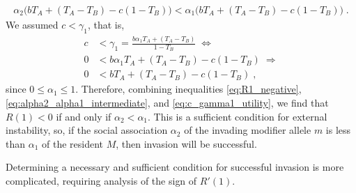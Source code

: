 \documentclass[12pt]{extarticle}
\begin{document}
\begin{appendices}
\begin{equation}
\begin{aligned}
\alpha_2 \big(b T_{A} + (T_A-T_B) - c(1-T_B)\big) <
\alpha_1 \big(b T_{A} + (T_A-T_B) - c(1-T_B)\big) \;.
\end{aligned}
\end{equation}
We assumed $c<\gamma_1$, that is,
\begin{equation} \label{eq:c_gamma1_utility}
\begin{aligned}
c &< \gamma_1 = \frac{b \alpha_1 T_A + (T_A-T_B)}{1-T_B} \; \Leftrightarrow \\
0 &< b \alpha_1 T_A + (T_A-T_B) - c(1-T_B) \; \Rightarrow \\
0 &< b T_A + (T_A-T_B) - c(1-T_B) \;,
\end{aligned}
\end{equation}
since $0 \le \alpha_1 \le 1$.
Therefore, combining inequalities \ref{eq:R1_negative}, \ref{eq:alpha2_alpha1_intermediate}, and \ref{eq:c_gamma1_utility}, we find that $R(1)<0$ if and only if $\alpha_2 < \alpha_1$. This is a sufficient condition for external instability, so, if the social association $\alpha_2$ of the invading modifier allele $m$ is less than $\alpha_1$ of the resident $M$, then invasion will be successful.

Determining a necessary and sufficient condition for successful invasion is more complicated, requiring analysis of the sign of $R'(1)$.

  
  
  
\end{appendices}




\end{document}
